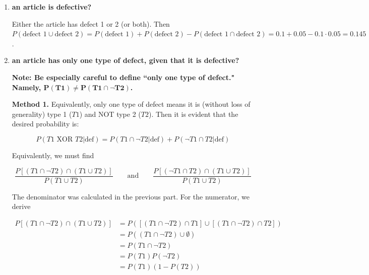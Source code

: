 \documentclass[10pt, oneside]{article}
\begin{document}
\begin{enumerate}[label=3.\arabic*]
\begin{enumerate}
	The probability that an article has both defects, by independence, is $0.1 \cdot 0.05 = 0.005$. The probability of the complementary event is simply $1 - 0.005 = \boxed{0.995}$.
	
	\item  \begin{tcolorbox}[
	  colback=Cerulean!5!white,
	  colframe=Cerulean!75!black]
	\textbf{an article is defective?}
	\end{tcolorbox}
	
	Either the article has defect 1 or 2 (or both). Then $P(\text{defect 1} \cup \text{defect 2}) = P(\text{defect 1}) + P(\text{defect 2}) - P(\text{defect 1} \cap \text{defect 2}) = 0.1 + 0.05 - 0.1 \cdot 0.05 = \boxed{0.145}$.
	
	\item  \begin{tcolorbox}[
	  colback=Cerulean!5!white,
	  colframe=Cerulean!75!black]
	\textbf{an article has only one type of defect, given that it is defective?}
	\end{tcolorbox}
	
	\textbf{Note: Be especially careful to define ``only one type of defect." Namely, $\bm{P(T1) \neq P(T1 \cap \neg T2)}$.}
	
	\textbf{Method 1.} Equivalently, only one type of defect means it is (without loss of generality) type 1 ($T1$) and NOT type 2 ($T2$). Then it is evident that the desired probability is:
	
	\[ P(T1 \text{ XOR } T2 | \text{def}) = P(T1 \cap \neg T2 | \text{def}) + P(\neg T1 \cap T2 | \text{def}) \]
	
	Equivalently, we must find
	
	\[ \frac{P [ (T1 \cap \neg T2) \cap (T1 \cup T2) ]}{P(T1 \cup T2)} \qquad \text{and} \qquad \frac{P [ (\neg T1 \cap T2) \cap (T1 \cup T2) ]}{P(T1 \cup T2)}  \]
	
	The denominator was calculated in the previous part. For the numerator, we derive
	
	\begin{align*}
	P [ (T1 \cap \neg T2) \cap (T1 \cup T2) ] &= P([ (T1 \cap \neg T2) \cap T1 ] \cup [(T1 \cap \neg T2) \cap T2]) \\
	&= P( (T1 \cap \neg T2) \cup \emptyset) \\
	&= P(T1 \cap \neg T2) \\
	&= P(T1)P(\neg T2) \\
	&= P(T1)(1 - P(T2))
	\end{align*}
	

\end{enumerate}
\end{enumerate}
\end{document}

